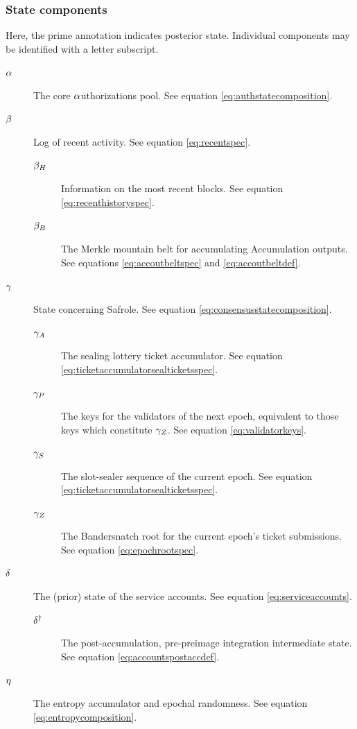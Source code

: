 \subsubsection{State components}

Here, the prime annotation indicates posterior state. Individual components may be identified with a letter subscript.
\begin{description}
  \item[$\alpha$] The core $\alpha$uthorizations pool. See equation \ref{eq:authstatecomposition}.
  \item[$\beta$] Log of recent activity. See equation \ref{eq:recentspec}.
  \begin{description}
    \item[$\beta_H$] Information on the most recent blocks. See equation \ref{eq:recenthistoryspec}.
    \item[$\beta_B$] The Merkle mountain belt for accumulating Accumulation outputs. See equations \ref{eq:accoutbeltspec} and \ref{eq:accoutbeltdef}.
  \end{description}
  \item[$\gamma$] State concerning Safrole. See equation \ref{eq:consensusstatecomposition}.
  \begin{description}
    \item[$\gamma_A$] The sealing lottery ticket accumulator. See equation \ref{eq:ticketaccumulatorsealticketsspec}.
    \item[$\gamma_P$] The keys for the validators of the next epoch, equivalent to those keys which constitute $\gamma_Z$. See equation \ref{eq:validatorkeys}.
    \item[$\gamma_S$] The slot-sealer sequence of the current epoch. See equation \ref{eq:ticketaccumulatorsealticketsspec}.
    \item[$\gamma_Z$] The Bandersnatch root for the current epoch's ticket submissions. See equation \ref{eq:epochrootspec}.
  \end{description}
  \item[$\delta$] The (prior) state of the service accounts. See equation \ref{eq:serviceaccounts}.
  \begin{description}
    \item[$\delta^\dagger$] The post-accumulation, pre-preimage integration intermediate state. See equation \ref{eq:accountspostaccdef}.
  \end{description}
  \item[$\eta$] The entropy accumulator and epochal randomness. See equation \ref{eq:entropycomposition}.

\end{description}
